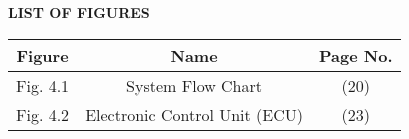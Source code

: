 \newpage
\begin{center}
\textbf{\LARGE LIST OF FIGURES}\\[1cm]
\end{center}
\begin{table}[h]
    \Large
    \centering
    \begin{tabular}{|c|c|c|} %
        \hline
        \textbf{Figure} & \textbf{Name} & \textbf{Page No.} \\[1cm] 
        \hline
        Fig. 4.1 & System Flow Chart & (20) \\[1cm]
        \hline
        Fig. 4.2 & Electronic Control Unit (ECU) & (23) \\[1cm]
        \hline
    \end{tabular}
\end{table}

